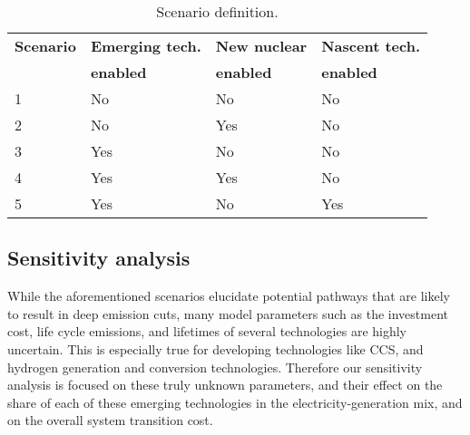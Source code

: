 \begin{table}[!ht]
	\caption{Scenario definition.}
	\vspace{0.1in}
	\begin{tabularx}{\textwidth}{p{} p{} p{} p{}}
\hline 
\textbf{Scenario}& \textbf{Emerging tech.} & \textbf{New nuclear} & \textbf{Nascent tech.}\\
                 & \textbf{enabled} & \textbf{enabled} & \textbf{enabled}\\
                  \hline
1               &  No       &         No     &     No  \\ 
2               &   No       &      Yes     &     No  \\ 
3               &   Yes     &         No      &     No   \\
4               &   Yes     &      Yes     &     No  \\ 
5               &   Yes     &      No     &     Yes  \\ 
\hline
	\end{tabularx}
\label{scen-table}
\end{table}



\subsection{Sensitivity analysis}
While the aforementioned scenarios elucidate potential pathways that are likely to result in deep emission cuts, many model parameters such as the investment cost, life cycle emissions, and lifetimes of several technologies are highly uncertain. This is especially true for developing technologies like \gls{CCS}, and hydrogen generation and conversion technologies. Therefore our sensitivity analysis is focused on these truly unknown parameters, and their effect on the share of each of these emerging technologies in the electricity-generation mix, and on the overall system transition cost. 

